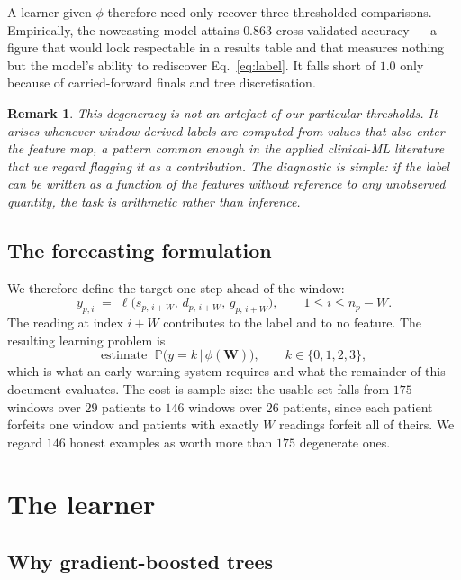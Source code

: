 \documentclass[11pt,a4paper]{article}
\newtheorem{remark}{Remark}
\newcommand{\Prob}{\mathbb{P}}
\begin{document}
A learner given $\phi$ therefore need only recover three thresholded comparisons.
Empirically, the nowcasting model attains $0.863$ cross-validated accuracy ---
a figure that would look respectable in a results table and that measures nothing
but the model's ability to rediscover Eq.~\eqref{eq:label}. It falls short of
$1.0$ only because of carried-forward finals and tree discretisation.

\begin{remark}
This degeneracy is not an artefact of our particular thresholds. It arises whenever
window-derived labels are computed from values that also enter the feature map, a
pattern common enough in the applied clinical-ML literature that we regard flagging
it as a contribution. The diagnostic is simple: if the label can be written as a
function of the features without reference to any unobserved quantity, the task is
arithmetic rather than inference.
\end{remark}

\subsection{The forecasting formulation}

We therefore define the target one step ahead of the window:
\begin{equation}
\label{eq:target}
  y_{p,i} \;=\; \ell\bigl(s_{p,\,i+W},\, d_{p,\,i+W},\, g_{p,\,i+W}\bigr),
  \qquad 1 \le i \le n_p - W .
\end{equation}
The reading at index $i+W$ contributes to the label and to no feature. The
resulting learning problem is
\[
  \text{estimate } \; \Prob\bigl(y = k \,\big|\, \phi(\mathbf{W})\bigr),
  \qquad k \in \{0,1,2,3\},
\]
which is what an early-warning system requires and what the remainder of this
document evaluates. The cost is sample size: the usable set falls from $175$
windows over $29$ patients to $146$ windows over $26$ patients, since each patient
forfeits one window and patients with exactly $W$ readings forfeit all of theirs.
We regard $146$ honest examples as worth more than $175$ degenerate ones.

\section{The learner}
\label{sec:learner}

\subsection{Why gradient-boosted trees}
\end{document}
